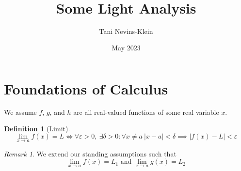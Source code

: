 \documentclass{article}
\title{Some Light Analysis}
\author{Tani Nevins-Klein}
\date{May 2023}
\begin{document}
\newtheorem{theorem}{Theorem}[section]
\newtheorem{lemma}[theorem]{Lemma}

\theoremstyle{definition}
\newtheorem{definition}{Definition}[section]

\theoremstyle{remark}
\newtheorem*{remark}{Remark}

\maketitle


\section{Foundations of Calculus}
We assume $f$, $g$, and $h$ are all real-valued functions of some real variable $x$.
\begin{definition}[Limit]
$$
\lim_{x \to a} f(x) = L \iff \forall \varepsilon > 0,\ \exists \delta > 0 : \forall x \neq a \ |x - a| < \delta \implies |f(x) - L| < \varepsilon
$$
\end{definition}

\begin{remark}
We extend our standing assumptions such that $$
\lim_{x \to a} f(x) = L_1 \text{ and } \lim_{x \to a} g(x) = L_2
$$
\end{remark}
\end{document}
